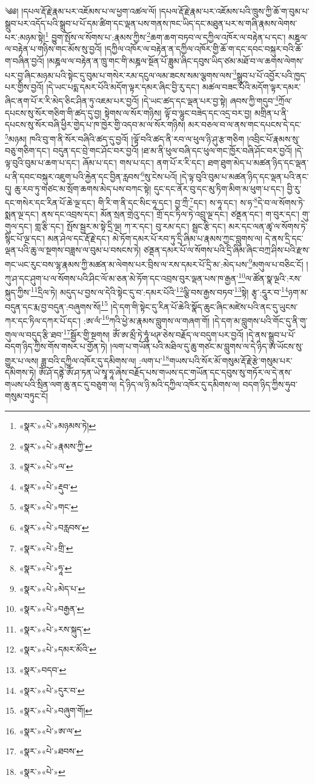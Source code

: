 ༄༅། །དཔལ་རྡོ་རྗེ་རྣམ་པར་འཇོམས་པ་ལ་ཕྱག་འཚལ་ལོ། །དཔལ་རྡོ་རྗེ་རྣམ་པར་འཇོམས་པའི་ཁྲུས་ཀྱི་ཆོ་ག་བུམ་པ་སྒྲུབ་པར་འདོད་པའི་སྒྲུབ་པ་པོ་དམ་ཚིག་དང་ལྡན་པས་གནས་ཁང་ཡིད་དང་མཐུན་པར་ས་གཞི་རྣམས་ལེགས་པར་:མཉམ་སྟེ།\footnote{«སྣར་»«པེ་»མཉམས་ཏེ།} བྱུག་སྤོས་ལ་སོགས་པ་:རྣམས་ཀྱིས་\footnote{«སྣར་»«པེ་»རྣམས་ཀྱི་}ཆག་ཆག་བཏབ་ལ་དཀྱིལ་འཁོར་ལ་བརྟེན་པ་དང་། མཎྜལ་ལ་བརྟེན་པ་གཉིས་གང་མོས་སུ་བྱའོ། །དཀྱིལ་འཁོར་ལ་བརྟེན་ན་དཀྱིལ་འཁོར་གྱི་ཆོ་ག་དང་དབང་བསྐུར་བའི་ཆོ་ག་བཞིན་བྱའོ། །མཎྜལ་ལ་བརྟེན་ན་ཁྲུ་གང་གི་མཎྜལ་སྔོན་པོ་ཟླུམ་ཞིང་དབུས་ཡིད་ཙམ་མཐོ་བ་ལ་ཆགས་ལེགས་པར་བྱ་ཞིང་མཉམ་པའི་སྟེང་དུ་བུམ་པ་གསེར་རམ་དངུལ་ལམ་ཟངས་སམ་ལྕགས་ལས་\footnote{«སྣར་»«པེ་»ལ་}སྒྲུབ་པ་པོ་འབྱོར་པའི་ཁྱད་པར་གྱིས་བྱའོ། །དེ་ཡང་པདྨ་དམར་པོའི་མདོག་ལྟར་དམར་ཞིང་བྱི་རུ་དང་། མཚལ་བཟང་པོའི་མདོག་ལྟར་དམར་ཞིང་ནག་པོ་ར་རི་མེད་ཅིང་ཤིན་ཏུ་འཇམ་པར་བྱའོ། །དེ་ཡང་ཚད་དང་ལྡན་པར་བྱ་སྟེ། ཞབས་ཀྱི་གདུབ་\footnote{«སྣར་»«པེ་»རྡུབ་}ཀྲོལ་དཔངས་སུ་སོར་གཅིག་གི་ཚད་དུ་བྱ། སྟེགས་ལ་སོར་གཉིས། ལྟོ་བ་ལྷུང་བཟེད་དང་འདྲ་བར་བྱ། མགྲིན་པ་ནི་དཔངས་སུ་སོར་བཞི་ཕྱིར་གྱེད་པ་ཁ་ཁྱེར་གྱི་འདབ་མ་ལ་སོར་གཉིས། མར་བཅལ་བ་ལ་ནས་གང་དཔངས་དེ་དང་\footnote{«སྣར་»«པེ་»གང་}མཉམ། ཁའི་བུ་ག་ནི་སོར་བཞིའི་ཚད་དུ་བྱའོ། །ལྟོ་བའི་ཚད་ནི་རབ་ལ་ཕུལ་ཉི་ཤུ་རྩ་གཅིག །འབྲིང་པོ་རྣམས་སུ་བཅུ་གཅིག་དང་། བདུན་དང་བྲེ་གང་ཤོང་བར་བྱའོ། །ཐ་མ་ནི་ཕུལ་བཞི་དང་ཕུལ་གང་ཁྱོར་བཞི་ཤོང་བར་བྱའོ། །དེ་ལྟ་བུའི་བུམ་པ་ཆག་པ་དང་། ཞོམ་པ་དང་། གས་པ་དང་། ནག་པོ་ར་རི་དང་། ཐག་ཐུག་མེད་པ་མཚན་ཉིད་དང་ལྡན་པ་ནི་དབང་བསྐུར་འཇུག་པའི་རྐྱེན་དང་བྱིན་རླབས་\footnote{«སྣར་»«པེ་»བརླབས་}སུ་ངེས་པའོ། །དེ་ལྟ་བུའི་བུམ་པ་མཚན་ཉིད་དང་ལྡན་པའི་ནང་དུ། ཆུ་རབ་ཏུ་གཙང་མ་སྲོག་ཆགས་མེད་པས་བཀང་སྟེ། དུང་དང་ནོར་བུ་དང་མུ་ཏིག་མིག་མ་ཕུག་པ་དང་། བྱི་རུ་དང་གསེར་དང་རིན་པོ་ཆེ་ལྔ་དང་། གི་རི་ག་ནི་དང་སིང་ཧཱ་དང་། བྱ་ཀྲྀ་\footnote{«སྣར་»«པེ་»གྲི་}དང་། ས་ཧཱ་དང་། ས་ཧ་\footnote{«སྣར་»«པེ་»ཧཱ་}དེ་བ་ལ་སོགས་ཏེ་སྨན་ལྔ་དང་། ནས་དང་འབྲས་དང་། མོན་སྲན་གྲེའུ་དང་། གྲོ་དང་ཏིལ་ཏེ་འབྲུ་ལྔ་དང་། ཙནྡན་དང་། ག་བུར་དང་། གུ་གུལ་དང་། གླ་རྩི་དང་། སྤོས་སྦྱར་མ་སྟེ་དྲི་ལྔ། ཀ་ར་དང་། བུ་རམ་དང་། སྦྲང་རྩི་དང་། མར་དང་ལན་ཚྭ་ལ་སོགས་ཏེ་སྙིང་པོ་ལྔ་དང་། མན་ཤེལ་དང་རྡོ་རྗེ་དང་། མེ་ཏོག་དམར་པོ་རབ་ཏུ་དྲི་ཞིམ་པ་རྣམས་ཀྱང་བླུགས་ལ། དེ་ནས་དྲི་དང་ལྡན་པའི་ཆུ་ལ་སྔགས་བཟླས་ལ་བུམ་པ་བསངས་ཏེ། ཙནྡན་དམར་པོ་ལ་སོགས་པའི་དྲི་ཞིམ་ཞིང་བཀྲ་ཤིས་པའི་རྫས་གང་ཡང་རུང་བས་ལྷ་རྣམས་ཀྱི་མཚན་མ་ལེགས་པར་བྲིས་ལ་རས་དམར་པོ་དྲི་མ་:མེད་པས་\footnote{«སྣར་»«པེ་»མེད་པ་}མགུལ་པ་བཅིང་ངོ། །ཀུ་ཤ་དང་ཤུག་པ་ལ་སོགས་པའི་ཤིང་ལོ་མ་ཅན་མེ་ཏོག་དང་འབྲས་བུར་ལྡན་པས་ཁ་རྒྱན་\footnote{«སྣར་»«པེ་»བརྒྱན་}ལ་ཚོན་སྣ་ལྔའི་:རས་སྐུད་ཀྱིས་\footnote{«སྣར་»«པེ་»རས་སྐུད་}དྲིལ་ཏེ། མདུད་པ་བྱས་ལ་དེའི་སྟེང་དུ་བ་:དམར་པོའི་\footnote{«སྣར་»«པེ་»དམར་མོའི་}ལྕི་བས་རྒྱས་བཏབ་\footnote{«སྣར་»བདབ་}སྟེ། རྩྭ་:དཱུར་བ་\footnote{«སྣར་»«པེ་»དུར་བ་}ཉག་མ་བདུན་དང་རྨ་བྱ་བདུན་:བཞུགས་སོ།\footnote{«སྣར་»«པེ་»བཞུག་གོ།} །དེ་དག་གི་སྟེང་དུ་རིན་པོ་ཆེའི་སྣོད་ཆུང་ཞིང་མཛེས་པའི་ནང་དུ་ཡུངས་ཀར་དང་ཏིལ་དཀར་པོ་དང་། :ཨ་ལཾ་\footnote{«སྣར་»«པེ་»ཨ་ལ་}ཀའི་ཕྱེ་མ་རྣམས་བླུགས་ལ་གཞག་གོ། །དེ་དག་མ་བླུགས་པའི་གོང་དུ་ནི་གུ་གུལ་ལ་བདུད་རྩི་ཐབ་\footnote{«སྣར་»«པེ་»ཐབས་}སྦྱོར་གྱི་སྔགས། ཨོཾ་ཨ་མྲྀ་ཏེ་ཧཱུཾ་ཕཊ་ཅེས་བརྗོད་ལ་བདུག་པར་བྱའོ། །དེ་ནས་སྒྲུབ་པ་པོ་བདག་ཉིད་ཀྱིས་གོས་གསར་པ་གྱོན་ཏེ། །ལག་པ་གཡོན་པའི་མཐིལ་དུ་ཆུ་གཙང་མ་བླུགས་ལ་དེ་ཉིད་ཨ་ཡོངས་སུ་གྱུར་པ་ལས། ཟླ་བའི་དཀྱིལ་འཁོར་དུ་དམིགས་ལ། :ལག་པ་\footnote{«སྣར་»«པེ་»}གཡས་པའི་སོར་མོ་གསུམ་རྡོ་རྗེ་རྩེ་གསུམ་པར་དམིགས་ཏེ། ཨོཾ་ཤོ་དནྟེ་ཨོཾ་ཤ་ཏན་ཡེ་སྭཱ་ཧཱ་ཞེས་བརྗོད་པས་གཡས་དང་གཡོན་དང་དབུས་སུ་གཏོར་ལ་དེ་ནས་གཡས་པའི་སྲིན་ལག་ཆུ་ནང་དུ་བཅུག་ལ། དེ་ཉིད་ལ་ཉི་མའི་དཀྱིལ་འཁོར་དུ་དམིགས་ལ། བདག་ཉིད་ཀྱིས་ཧུབ་གསུམ་བཏུང་ངོ། 